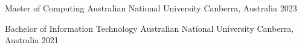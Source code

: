 

\begin{cventries}

  \cventry
    {Master of Computing} %
    {Australian National University} %
    {Canberra, Australia} %
    {2023} %
    {}
    
  \cventry
    {Bachelor of Information Technology} %
    {Australian National University} %
    {Canberra, Australia} %
    {2021} %
    {}
    
\end{cventries}
